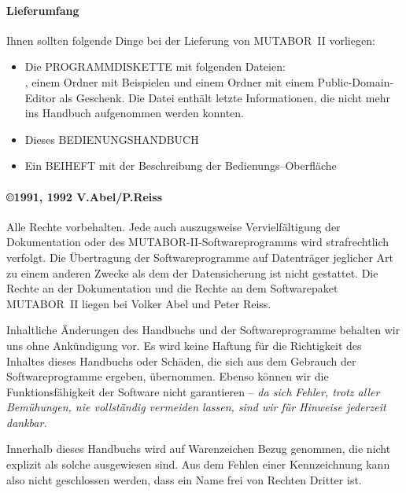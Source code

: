 \paragraph{Lieferumfang}
Ihnen sollten folgende Dinge bei der Lieferung von MUTABOR~II
vorliegen:

\begin{itemize}
\item Die PROGRAMMDISKETTE mit folgenden Dateien:\\ 
, 
einem Ordner  mit 
Beispielen und einem Ordner mit einem Public-Domain-Editor
als Geschenk. Die Datei  enthält letzte
 Informationen, die nicht mehr ins Handbuch aufgenommen
werden konnten.
\item Dieses BEDIENUNGSHANDBUCH
\item Ein BEIHEFT mit der Beschreibung der Bedienungs--Oberfläche
\end{itemize}

\paragraph{\copyright 1991, 1992 V.Abel/P.Reiss}
Alle Rechte vorbehalten. Jede auch auszugsweise Vervielfältigung der Dokumentation oder des MUTABOR-II-Softwareprogramms wird strafrechtlich verfolgt. Die Übertragung der Softwareprogramme auf Datenträger jeglicher Art zu einem anderen Zwecke als dem der Datensicherung ist nicht gestattet. Die Rechte an der Dokumentation und die Rechte an dem Softwarepaket
MUTABOR~II liegen bei Volker Abel und Peter Reiss. 
\fi

 Inhaltliche Änderungen des Handbuchs und der
Softwareprogramme behalten wir uns ohne Ankündigung vor. Es wird keine
Haftung für die Richtigkeit des Inhaltes dieses Handbuchs oder
Schäden, die sich aus dem Gebrauch der Softwareprogramme ergeben,
übernommen. Ebenso können wir die Funktionsfähigkeit der Software
nicht garantieren -- \emph{da sich Fehler, trotz aller Bemühungen, nie
  vollständig vermeiden lassen, sind wir für Hinweise jederzeit
  dankbar.}

Innerhalb dieses Handbuchs wird auf Warenzeichen Bezug genommen, die nicht explizit als solche ausgewiesen sind. Aus dem Fehlen einer Kennzeichnung kann also nicht geschlossen werden, dass ein Name frei von Rechten Dritter ist.

